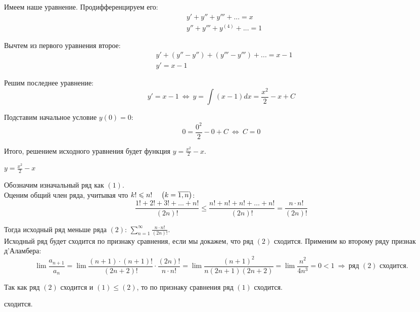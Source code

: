  {
    Имеем наше уравнение. Продифференцируем его:
    \begin{align*}
        & y'+y''+y'''+...=x  \\
        & y''+y'''+y^{(4)}+...=1
    \end{align*}
    
    Вычтем из первого уравнения второе:
    \begin{align*}
        & y'+(y''-y'')+(y'''-y''')+...=x - 1  \\
        & y' = x-1
    \end{align*}
    
    Решим последнее уравнение:
        $$y' = x-1 \ \Leftrightarrow \ y =\int (x-1)dx = \frac{x^2}2-x+C$$
    
    Подставим начальное условие $y(0)=0$:
        $$0 = \frac{0^2}2 - 0 + C \ \Leftrightarrow \ C = 0$$
    
    Итого, решением исходного уравнения будет функция $y= \frac{x^2}2-x$.
}{ $y= \frac{x^2}2-x$ }\newpage

 {
    Обозначим изначальный ряд как $(1)$.\\
    
    Оценим общий член ряда, учитывая что  $k! \leqslant n!\hspace{4mm} \left( {k=\overline{1,n}} \right)$:
        $$\frac{1! + 2!+ 3!+\ldots+n!}{(2n)!} \leqslant \frac{n! + n!+ n!+\ldots+n!}{(2n)!} = \frac{n \cdot n!}{(2n)!}$$
        
    Тогда исходный ряд меньше ряда $(2)$: $\displaystyle \sum_{n=1}^{\infty} \frac{n \cdot n!}{(2n)!}$.\\
    
    Исходный ряд будет сходится по признаку сравнения, если мы докажем, что ряд $(2)$ сходится. Применим ко второму ряду признак д'Аламбера:
        $$\lim {\frac{a_{n+1}}{a_n}} = \lim \frac{(n+1) \cdot (n+1)!}{(2n+2)!} \cdot \frac{(2n)!}{n \cdot n!} = \lim \frac{(n+1)^2}{n(2n+1)(2n+2)} = \lim \frac{n^2}{4n^3} = 0 < 1 \ \Rightarrow \ \text{ряд $(2)$ сходится.}$$
    
    Так как ряд $(2)$ сходится и $(1) \leqslant (2)$, то по признаку сравнения ряд $(1)$ сходится.
}{ сходится. }\newpage

